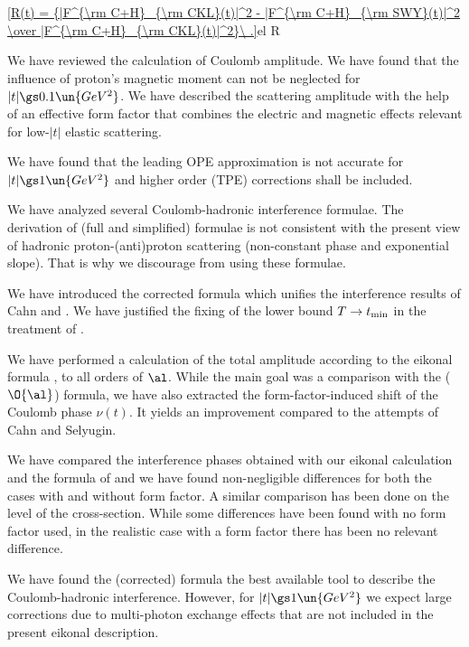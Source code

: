 \eqref{R(t) = {|F^{\rm C+H}_{\rm CKL}(t)|^2 - |F^{\rm C+H}_{\rm SWY}(t)|^2 \over |F^{\rm C+H}_{\rm CKL}(t)|^2}\ .}{el R}



We have reviewed the calculation of Coulomb amplitude. We have found that the influence of proton's magnetic moment can not be neglected for $|t| \gs 0.1\un{GeV^2}$. We have described the scattering amplitude with the help of an effective form factor that combines the electric and magnetic effects relevant for low-$|t|$ elastic scattering.

We have found that the leading OPE approximation is not accurate for $|t| \gs 1\un{GeV^2}$ and higher order (TPE) corrections shall be included.

We have analyzed several Coulomb-hadronic interference formulae. The derivation of (full and simplified) \WaY{} formulae is not consistent with the present view of hadronic proton-(anti)proton scattering (non-constant phase and exponential slope). That is why we discourage from using these formulae.

We have introduced the corrected \KaL{} formula which unifies the interference results of Cahn and \KaL. We have justified the fixing of the lower bound $T\to t_{\rm min}$ in the treatment of \KaL{}.

We have performed a calculation of the total amplitude according to the eikonal formula , to all orders of $\al$. While the main goal was a comparison with the ($\O{\al}$) \KaL{} formula, we have also extracted the form-factor-induced shift of the Coulomb phase $\nu(t)$. It yields an improvement compared to the attempts of Cahn and Selyugin.

We have compared the interference phases obtained with our eikonal calculation and the formula of \KaL{} and we have found non-negligible differences for both the cases with and without form factor. A similar comparison has been done on the level of the cross-section. While some differences have been found with no form factor used, in the realistic case with a form factor there has been no relevant difference.

We have found the (corrected) \KaL{} formula the best available tool to describe the Coulomb-hadronic interference. However, for $|t| \gs 1\un{GeV^2}$ we expect large corrections due to multi-photon exchange effects that are not included in the present eikonal description.
